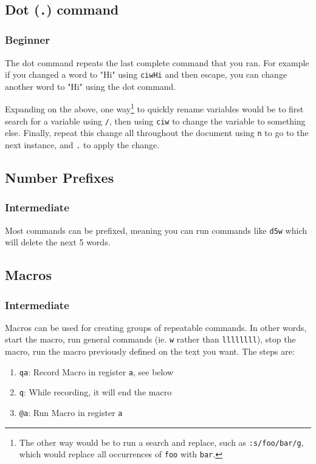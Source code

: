 \documentclass[11pt]{article}
\begin{document}
\subsection{Dot (\texttt{.}) command}
\label{sec:orgb4eb27c}
\subsubsection{Beginner}
\label{sec:org9c2a62f}
The dot command repeats the last complete command that you ran. For example if
you changed a word to "Hi" using \texttt{ciwHi} and then escape, you can change another
word to "Hi" using the dot command.

Expanding on the above, one way\footnote{The other way would be to run a search and replace, such as 
\texttt{:s/foo/bar/g}, which would replace all occurrences of \texttt{foo} with \texttt{bar}.} to quickly rename variables would be to
first search for a variable using \texttt{/}, then using \texttt{ciw} to change the variable
to something else. Finally, repeat this change all throughout the document using
\texttt{n} to go to the next instance, and \texttt{.} to apply the change.
\subsection{Number Prefixes}
\label{sec:orgdbdbf8e}
\subsubsection{Intermediate}
\label{sec:orged1b397}
Most commands can be prefixed, meaning you can run commands like \texttt{d5w} which
will delete the next 5 words.
\subsection{Macros}
\label{sec:org13cb18b}
\subsubsection{Intermediate}
\label{sec:orgcd98c57}
Macros can be used for creating groups of repeatable commands. In other words,
start the macro, run general commands (ie. \texttt{w} rather than \texttt{llllllll}), stop the
macro, run the macro previously defined on the text you want. The steps are:

\begin{enumerate}
\item \texttt{qa}: Record Macro in register \texttt{a}, see below
\item \texttt{q}: While recording, it will end the macro
\item \texttt{@a}: Run Macro in register \texttt{a}
\end{enumerate}
\end{document}
